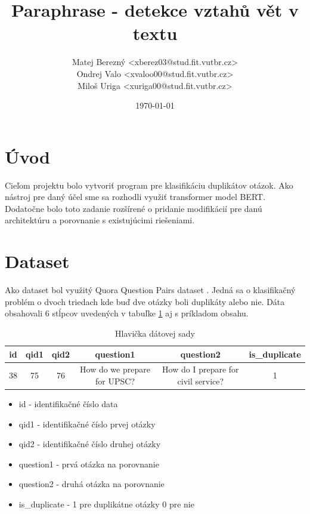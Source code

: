 \documentclass[a4paper, 16pt]{article}
\title{Paraphrase - detekce vztahů vět v textu}
\author{Matej Berezný <xberez03@stud.fit.vutbr.cz>\\
Ondrej Valo <xvaloo00@stud.fit.vutbr.cz>\\
Miloš Uriga <xuriga00@stud.fit.vutbr.cz>}
\date{\today}
\begin{document}
\maketitle

\section{Úvod}
\label{uvod}
Cieľom projektu bolo vytvoriť program pre klasifikáciu duplikátov otázok. Ako nástroj pre daný účel sme sa rozhodli využiť transformer model BERT. Dodatočne bolo toto zadanie rozšírené o pridanie modifikácií pre danú architektúru a porovnanie s existujúcimi riešeniami.



\section{Dataset}
\label{dataset}
Ako dataset bol využitý Quora Question Pairs dataset \cite{quora}. Jedná sa o klasifikačný problém o dvoch triedach kde buď dve otázky boli duplikáty alebo nie. Dáta obsahovali 6 stĺpcov uvedených v tabuľke \ref{table:data} aj s príkladom obsahu.
\begin{table}[H]
\centering
\begin{tabular}{ |c|c|c|c|c|c| } \hline
id & qid1 & qid2 & question1 & question2 & is\_duplicate\\ \hline
38 & 75 & 76 & How do we prepare for UPSC? & How do I prepare for civil service? & 1\\ \hline
\end{tabular}
\caption{Hlavička dátovej sady}
\label{table:data}
\end{table}
\begin{itemize}
    \item id - identifikačné číslo data
    
    \item qid1 - identifikačné číslo prvej otázky
    
    \item qid2 - identifikačné číslo druhej otázky
    
    \item question1 - prvá otázka na porovnanie
    
    \item question2 - druhá otázka na porovnanie
    
    \item is\_duplicate - 1 pre duplikátne otázky 0 pre nie
\end{itemize}
\end{document}
